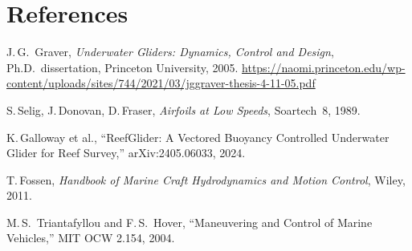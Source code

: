 \documentclass[11pt,a4paper]{article}
\begin{document}
\section*{References}
\begin{enumerate}[label={[\arabic*]},nosep]
  \item J.\,G.\ Graver, \emph{Underwater Gliders: Dynamics, Control and Design},
    Ph.D.\ dissertation, Princeton University, 2005.
    \url{https://naomi.princeton.edu/wp-content/uploads/sites/744/2021/03/jggraver-thesis-4-11-05.pdf}
  \item S.\,Selig, J.\,Donovan, D.\,Fraser, \emph{Airfoils at Low Speeds}, Soartech~8, 1989.
  \item K.\,Galloway et al., ``ReefGlider: A Vectored Buoyancy Controlled Underwater
    Glider for Reef Survey,'' arXiv:2405.06033, 2024.
  \item T.\,Fossen, \emph{Handbook of Marine Craft Hydrodynamics and Motion Control},
    Wiley, 2011.
  \item M.\,S.\ Triantafyllou and F.\,S.\ Hover, ``Maneuvering and Control of Marine
    Vehicles,'' MIT OCW 2.154, 2004.
\end{enumerate}
\end{document}
